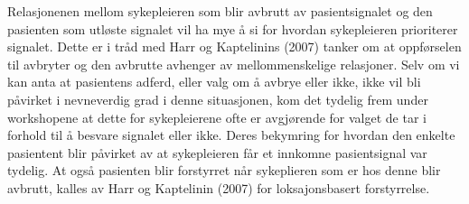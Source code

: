 \noindent
Relasjonenen mellom sykepleieren som blir avbrutt av pasientsignalet og den pasienten som utløste signalet vil ha mye å si for hvordan sykepleieren prioriterer signalet. Dette er i tråd med Harr og Kaptelinins (2007) tanker om at oppførselen til avbryter og den avbrutte avhenger av mellommenskelige relasjoner. Selv om vi kan anta at pasientens adferd, eller valg om å avbrye eller ikke, ikke vil bli påvirket i nevneverdig grad i denne situasjonen, kom det tydelig frem under workshopene at dette for sykepleierene ofte er avgjørende for valget de tar i forhold til å besvare signalet eller ikke.  
Deres bekymring for hvordan den enkelte pasientent blir påvirket av at sykepleieren får et innkomne pasientsignal var tydelig. At også pasienten blir forstyrret når sykeplieren som er hos denne blir avbrutt, kalles av Harr og Kaptelinin (2007) for loksajonsbasert forstyrrelse. 